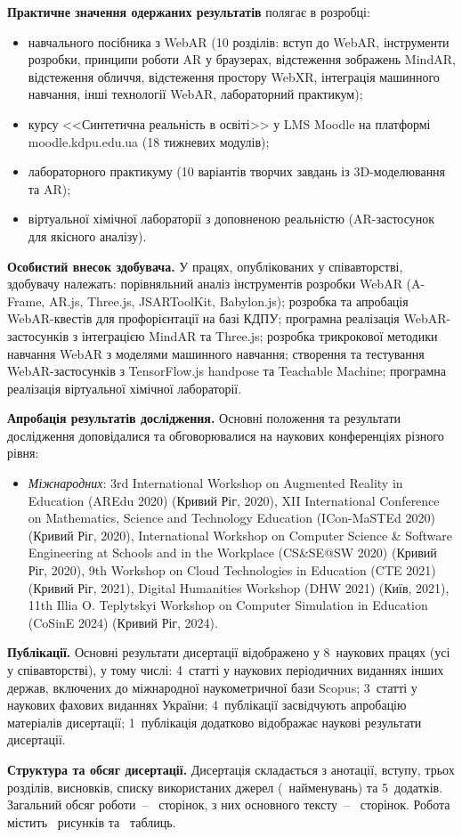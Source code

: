 \textbf{Практичне значення одержаних результатів} полягає в розробці:
\begin{itemize}
    \item навчального посібника з WebAR (10 розділів: вступ до WebAR, інструменти розробки, принципи роботи AR у браузерах, відстеження зображень MindAR, відстеження обличчя, відстеження простору WebXR, інтеграція машинного навчання, інші технології WebAR, лабораторний практикум);
    \item курсу <<Синтетична реальність в освіті>> у LMS Moodle на платформі moodle.kdpu.edu.ua (18 тижневих модулів);
    \item лабораторного практикуму (10 варіантів творчих завдань із 3D-моделювання та AR);
    \item віртуальної хімічної лабораторії з доповненою реальністю (AR-застосунок для якісного аналізу).
\end{itemize}

\textbf{Особистий внесок здобувача.} У працях, опублікованих у співавторстві, здобувачу належать: порівняльний аналіз інструментів розробки WebAR (A-Frame, AR.js, Three.js, JSARToolKit, Babylon.js); розробка та апробація WebAR-квестів для профорієнтації на базі КДПУ; програмна реалізація WebAR-застосунків з інтеграцією MindAR та Three.js; розробка трикрокової методики навчання WebAR з моделями машинного навчання; створення та тестування WebAR-застосунків з TensorFlow.js handpose та Teachable Machine; програмна реалізація віртуальної хімічної лабораторії.

\textbf{Апробація результатів дослідження.} Основні положення та результати дослідження доповідалися та обговорювалися на наукових конференціях різного рівня:
\begin{itemize}
    \item \textit{Міжнародних}:
3rd International Workshop on Augmented Reality in Education (AREdu 2020) (Кривий Ріг, 2020),
XII International Conference on Mathematics, Science and Technology Education (ICon-MaSTEd 2020) (Кривий Ріг, 2020),
International Workshop on Computer Science \& Software Engineering at Schools and in the Workplace (CS\&SE@SW 2020) (Кривий Ріг, 2020),
9th Workshop on Cloud Technologies in Education (CTE 2021) (Кривий Ріг, 2021),
Digital Humanities Workshop (DHW 2021) (Київ, 2021),
11th Illia O. Teplytskyi Workshop on Computer Simulation in Education (CoSinE 2024) (Кривий Ріг, 2024).
\end{itemize}

\textbf{Публікації.} Основні результати дисертації відображено у 8~наукових працях (усі у співавторстві), у тому числі: 4~статті у наукових періодичних виданнях інших держав, включених до міжнародної наукометричної бази Scopus; 3~статті у наукових фахових виданнях України; 4~публікації засвідчують апробацію матеріалів дисертації; 1~публікація додатково відображає наукові результати дисертації.

\textbf{Структура та обсяг дисертації.} Дисертація складається з анотації, вступу, трьох розділів, висновків, списку використаних джерел (~найменувань) та 5~додатків. Загальний обсяг роботи~-- \pageref{last_page}~сторінок, з них основного тексту~-- \pageref{end_main_text}~сторінок. Робота містить \totalfigures~рисунків та \totaltables~таблиць.
